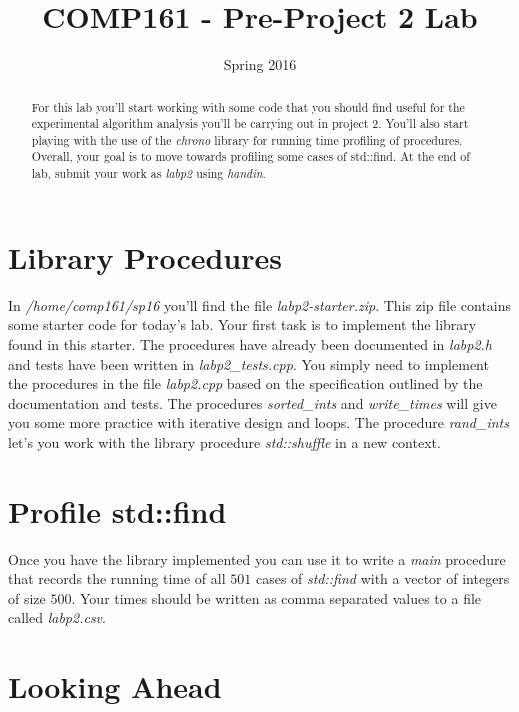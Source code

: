 \documentclass[]{tufte-handout}
\title{COMP161 - Pre-Project 2 Lab}
\author{}
\date{Spring 2016}
\begin{document}
\maketitle

\begin{abstract}
For this lab you'll start working with some code that you should find useful for the experimental algorithm analysis you'll be carrying out in project 2. You'll also start playing with the use of the \textit{chrono} library for running time profiling of procedures. Overall, your goal is to move towards profiling some cases of std::find. At the end of lab, submit your work as \textit{labp2} using \textit{handin}. 
\end{abstract}

\section{ Library Procedures }

In \textit{/home/comp161/sp16} you'll find the file \textit{labp2-starter.zip}. This zip file contains some starter code for today's lab. Your first task is to implement the library found in this starter. The procedures have already been documented in \textit{labp2.h} and tests have been written in \textit{labp2\_tests.cpp}. You simply need to implement the procedures in the file \textit{labp2.cpp} based on the specification outlined by the documentation and tests.  The procedures \textit{sorted\_ints} and \textit{write\_times} will give you some more practice with iterative design and loops. The procedure \textit{rand\_ints} let's you work with the library procedure \textit{std::shuffle} in a new context. 

\section{ Profile std::find }

Once you have the library implemented you can use it to write a \textit{main} procedure that records the running time of all $501$ cases of \textit{std::find} with a vector of integers of size $500$. Your times should be written as comma separated values to a file called \textit{labp2.csv}.  


\section{Looking Ahead}
\end{document}
